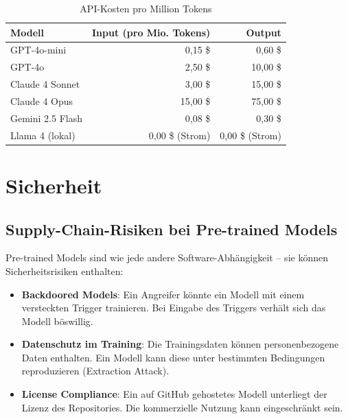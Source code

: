 \begin{table}[H]
\centering
\begin{tabularx}{\linewidth}{lrr}
\toprule
\textbf{Modell} & \textbf{Input (pro Mio. Tokens)} & \textbf{Output} \\
\midrule
GPT-4o-mini & 0,15 \$ & 0,60 \$ \\
GPT-4o & 2,50 \$ & 10,00 \$ \\
Claude 4 Sonnet & 3,00 \$ & 15,00 \$ \\
Claude 4 Opus & 15,00 \$ & 75,00 \$ \\
Gemini 2.5 Flash & 0,08 \$ & 0,30 \$ \\
Llama 4 (lokal) & 0,00 \$ (Strom) & 0,00 \$ (Strom) \\
\bottomrule
\end{tabularx}
\caption{API-Kosten pro Million Tokens}
\label{tab:api-kosten}
\end{table}


\section{Sicherheit}

\subsection{Supply-Chain-Risiken bei Pre-trained Models}

Pre-trained Models sind wie jede andere Software-Abhängigkeit -- sie können Sicherheitsrisiken enthalten:

\begin{itemize}[leftmargin=*]
    \item \textbf{Backdoored Models}: Ein Angreifer könnte ein Modell mit einem versteckten Trigger trainieren. Bei Eingabe des Triggers verhält sich das Modell böswillig.
    \item \textbf{Datenschutz im Training}: Die Trainingsdaten können personenbezogene Daten enthalten. Ein Modell kann diese unter bestimmten Bedingungen reproduzieren (Extraction Attack).
    \item \textbf{License Compliance}: Ein auf GitHub gehostetes Modell unterliegt der Lizenz des Repositories. Die kommerzielle Nutzung kann eingeschränkt sein.
\end{itemize}

